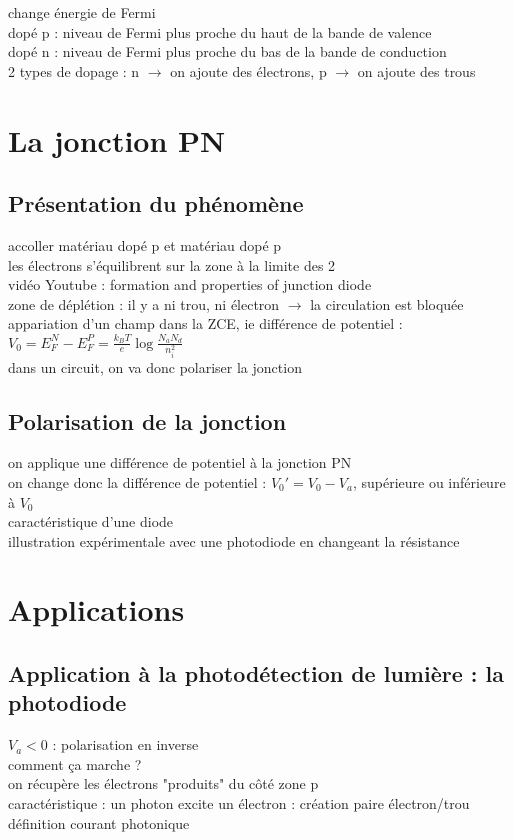change énergie de Fermi \\
dopé p : niveau de Fermi plus proche du haut de la bande de valence \\
dopé n : niveau de Fermi plus proche du bas de la bande de conduction \\

2 types de dopage : n $\rightarrow$ on ajoute des électrons, p $\rightarrow$ on ajoute des trous \\


\section{La jonction PN}
\subsection{Présentation du phénomène}
accoller matériau dopé p et matériau dopé p \\
les électrons s'équilibrent sur la zone à la limite des 2 \\
vidéo Youtube : formation and properties of junction diode   \\
zone de déplétion : il y a ni trou, ni électron $\rightarrow$ la circulation est bloquée \\
appariation d'un champ dans la ZCE, ie différence de potentiel : $V_0 = E_F^N -E_F^P = \frac{k_B T}{e} \log{\frac{N_a N_d }{n_i^2}}$ \\
dans un circuit, on va donc polariser la jonction \\

\subsection{Polarisation de la jonction}
on applique une différence de potentiel à la jonction PN \\
on change donc la différence de potentiel : $V_0'=V_0-V_a$, supérieure ou inférieure à $V_0$ \\
 caractéristique d'une diode \\
 illustration expérimentale avec une photodiode en changeant la résistance \\

\section{Applications}
\subsection{Application à la photodétection de lumière : la photodiode}
$V_a<0$ : polarisation en inverse \\
comment ça marche ? \\
on récupère les électrons "produits" du côté zone p \\
caractéristique : un photon excite un électron : création paire électron/trou \\
définition courant photonique \\

